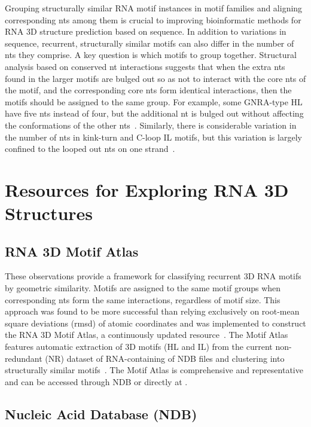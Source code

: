 Grouping structurally similar RNA motif instances in motif families and aligning
corresponding nts among them is crucial to improving bioinformatic methods for
RNA 3D structure prediction based on sequence. In addition to variations in
sequence, recurrent, structurally similar motifs can also differ in the number
of nts they comprise. A key question is which motifs to group together.
Structural analysis based on conserved nt interactions suggests that when the
extra nts found in the larger motifs are bulged out so as not to interact with
the core nts of the motif, and the corresponding core nts form identical
interactions, then the motifs should be assigned to the same group. For example,
some GNRA-type HL have five nts instead of four, but the additional nt is bulged
out without affecting the conformations of the other nts~\cite{Nasalean2009b}.
Similarly, there is considerable variation in the number of nts in kink-turn and
C-loop IL motifs, but this variation is largely confined to the looped out nts
on one strand~\cite{Lescoute2005}.

\section{Resources for Exploring RNA 3D Structures}

\subsection{RNA 3D Motif Atlas}

These observations provide a framework for classifying recurrent 3D RNA motifs
by geometric similarity. Motifs are assigned to the same motif groups when
corresponding nts form the same interactions, regardless of motif size. This
approach was found to be more successful than relying exclusively on root-mean
square deviations (rmsd) of atomic coordinates and was implemented to construct
the RNA 3D Motif Atlas, a continuously updated resource~\cite{Petrov2013}. The
Motif Atlas features automatic extraction of 3D motifs (HL and IL) from the
current non-redundant (NR) dataset of RNA-containing of NDB files and clustering
into structurally similar motifs~\cite{Petrov2013}. The Motif Atlas is
comprehensive and representative and can be accessed through NDB or directly at
.

\subsection{Nucleic Acid Database (NDB)}

